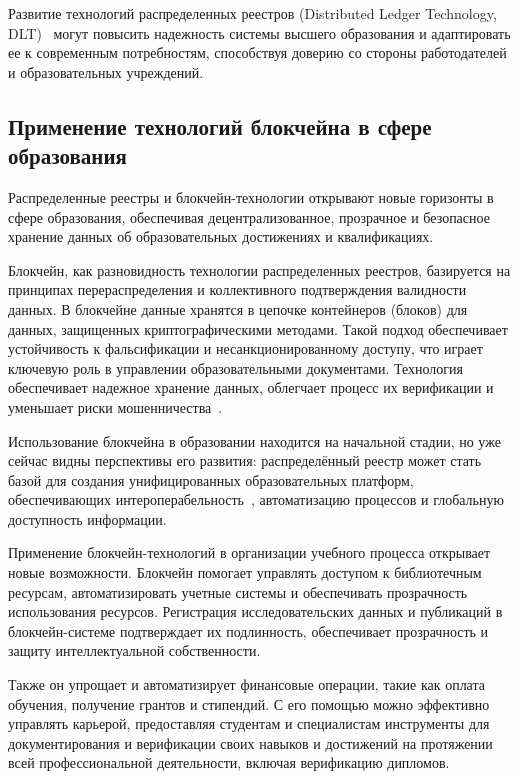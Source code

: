 Развитие технологий распределенных реестров (Distributed Ledger Technology, DLT)~\cite{bib:distributed_ledger} могут повысить надежность системы высшего образования и адаптировать ее к современным потребностям, способствуя доверию со стороны работодателей и образовательных учреждений.

\subsection{Применение технологий блокчейна в сфере образования}

Распределенные реестры и блокчейн-технологии открывают новые горизонты в сфере образования, обеспечивая децентрализованное, прозрачное и безопасное хранение данных об образовательных достижениях и квалификациях.

Блокчейн, как разновидность технологии распределенных реестров, базируется на принципах перераспределения и коллективного подтверждения валидности данных. В блокчейне данные хранятся в цепочке контейнеров (блоков) для данных, защищенных криптографическими методами. Такой подход обеспечивает устойчивость к фальсификации и несанкционированному доступу, что играет ключевую роль в управлении образовательными документами. Технология обеспечивает надежное хранение данных, облегчает процесс их верификации и уменьшает риски мошенничества~\cite{bib:blockchain_technology}.

Использование блокчейна в образовании находится на начальной стадии, но уже сейчас видны перспективы его развития: распределённый реестр может стать базой для создания унифицированных образовательных платформ, обеспечивающих интероперабельность~\cite{bib:interoperability}, автоматизацию процессов и глобальную доступность информации.

Применение блокчейн-технологий в организации учебного процесса открывает новые возможности. Блокчейн помогает управлять доступом к библиотечным ресурсам, автоматизировать учетные системы и обеспечивать прозрачность использования ресурсов. Регистрация исследовательских данных и публикаций в блокчейн-системе подтверждает их подлинность, обеспечивает прозрачность и защиту интеллектуальной собственности.

Также он упрощает и автоматизирует финансовые операции, такие как оплата обучения, получение грантов и стипендий. С его помощью можно эффективно управлять карьерой, предоставляя студентам и специалистам инструменты для документирования и верификации своих навыков и достижений на протяжении всей профессиональной деятельности, включая верификацию дипломов.

